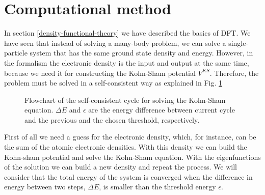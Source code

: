 \section{Computational method}

In section \ref{density-functional-theory} we have described the basics of DFT. We have seen that instead of solving a many-body problem, we can solve a single-particle system that has the same ground state density and 
energy. However, in the formalism the electronic density is the input and output at the same time, because we need it for constructing the Kohn-Sham potential $V^{KS}$. Therefore, the problem must be solved in a 
self-consistent way as explained in Fig. \ref{self-consistent-cycle} 
\begin{figure}[h]
\begin{center}
\end{center}
\caption[DFT self-consistent cycle]{Flowchart of the self-consistent cycle for solving the Kohn-Sham equation. $\Delta E$ and $\epsilon$ are the energy difference between current cycle and the previous and the chosen threshold, respectively.}
\label{self-consistent-cycle}
\end{figure}
First of all we need a guess for the electronic density, which, for instance, can be the sum of the atomic electronic densities. With this density we can build the 
Kohn-sham potential and solve the Kohn-Sham equation. With the eigenfunctions of the solution we can build a new density and repeat the process. We will consider that the total energy of the system is converged when 
the difference in energy between two steps, $\Delta E$, is smaller than the threshold energy $\epsilon$. \\

